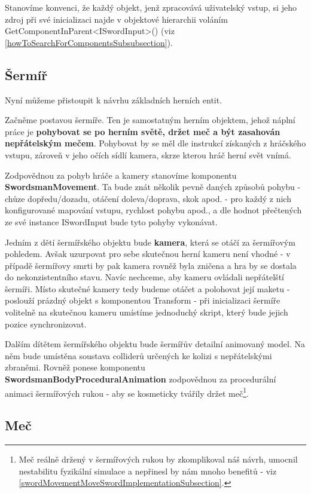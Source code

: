 Stanovíme konvenci, že každý objekt, jenž zpracovává uživatelský vstup, si jeho zdroj při své inicializaci najde v objektové hierarchii voláním GetComponentInParent<ISwordInput>() (viz \ref{howToSearchForComponentsSubsubsection}).


\subsection{Šermíř}

Nyní můžeme přistoupit k návrhu základních herních entit. 

Začněme postavou šermíře. Ten je samostatným herním objektem, jehož náplní práce je \textbf{pohybovat se po herním světě, držet meč a být zasahován nepřátelským mečem}. Pohybovat by se měl dle instrukcí získaných z hráčského vstupu, zároveň v jeho očích sídlí kamera, skrze kterou hráč herní svět vnímá.

Zodpovědnou za pohyb hráče a kamery stanovíme komponentu \textbf{SwordsmanMovement}. Ta bude znát několik pevně daných způsobů pohybu - chůze dopředu/dozadu, otáčení doleva/doprava, skok apod. - pro každý z nich konfigurované mapování vstupu, rychlost pohybu apod., a dle hodnot přečtených ze své instance ISwordInput bude tyto pohyby vykonávat. 

Jedním z dětí šermířského objektu bude \textbf{kamera}, která se otáčí za šermířovým pohledem. Avšak uzurpovat pro sebe skutečnou herní kameru není vhodné - v případě šermířovy smrti by pak kamera rovněž byla zničena a hra by se dostala do nekonzistentního stavu. Navíc nechceme, aby kameru ovládali nepřátelští šermíři. Místo skutečné kamery tedy budeme otáčet a polohovat její maketu - poslouží prázdný objekt s komponentou Transform - při inicializaci šermíře volitelně na skutečnou kameru umístíme jednoduchý skript, který bude jejich pozice synchronizovat.

Dalším dítětem šermířského objektu bude šermířův detailní animovaný model. Na něm bude umístěna soustava colliderů určených ke kolizi s nepřátelskými zbraněmi. Rovněž ponese komponentu \textbf{SwordsmanBodyProceduralAnimation} zodpovědnou za procedurální animaci šermířových rukou - aby se kosmeticky tvářily držet meč\footnote{Meč reálně držený v šermířových rukou by zkomplikoval náš návrh, umocnil nestabilitu fyzikální simulace a nepřinesl by nám mnoho benefitů - viz \ref{swordMovementMoveSwordImplementationSubsection}.}.


\subsection{Meč} 

